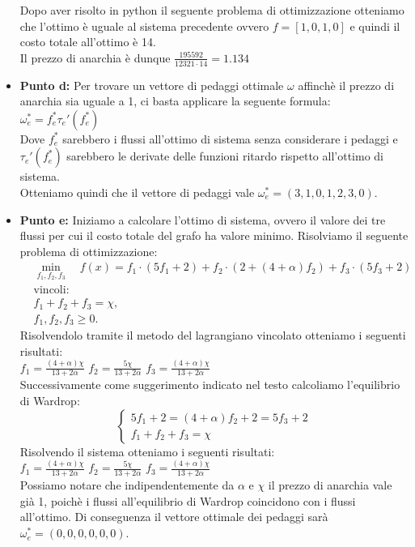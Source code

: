 \documentclass[a4paper,12pt]{article}
\begin{document}
\begin{itemize}
			Dopo aver risolto in python il seguente problema di ottimizzazione otteniamo che l'ottimo è uguale al sistema precedente ovvero $f=[1,0,1,0]$ e quindi il costo totale all'ottimo è 14.\\
			Il prezzo di anarchia è dunque $\frac{195592}{12321 \cdot14}=1.134$
			\item \textbf{Punto d: }Per trovare un vettore di pedaggi ottimale $\omega$ affinchè il prezzo di anarchia sia uguale a 1, ci basta applicare la seguente formula:\\
			$\omega_e^{*}=f_e^*\tau_e'(f_e^*)$\\
			Dove $f_e^*$ sarebbero i flussi all'ottimo di sistema senza considerare i pedaggi e $\tau_e'(f_e^*)$ sarebbero le derivate delle funzioni ritardo rispetto all'ottimo di sistema.\\
			Otteniamo quindi che il vettore di pedaggi vale $\omega_e^{*}=(3,1,0,1,2,3,0)$.
			\item \textbf{Punto e: }Iniziamo a calcolare l'ottimo di sistema, ovvero il valore dei tre flussi per cui il costo totale del grafo ha valore minimo. Risolviamo il seguente problema di ottimizzazione:\\
			\[
			\begin{aligned}
				&\min_{f_1, f_2, f_3} \quad f(x) = f_1 \cdot (5f_1+2) + f_2 \cdot (2+(4+\alpha)f_2) + f_3 \cdot(5f_3+2) \\
				&\text{vincoli:} \\
				&f_1 + f_2 + f_3= \chi, \\
				&f_1,f_2,f_3 \geq 0.
			\end{aligned}
			\]
			Risolvendolo tramite il metodo del lagrangiano vincolato otteniamo i seguenti risultati:\\
			$f_1=\frac{(4+\alpha)\chi}{13+2\alpha}$ $f_2=\frac{5\chi}{13+2\alpha}$ $f_3=\frac{(4+\alpha)\chi}{13+2\alpha}$\\
			Successivamente come suggerimento indicato nel testo calcoliamo l'equilibrio di Wardrop:\\
			\begin{equation}
				\begin{cases}
					5f_1+2=(4+\alpha)f_2+2=5f_3+2 \\
					f_1+f_2+f_3=\chi
				\end{cases}
			\end{equation}
			Risolvendo il sistema otteniamo i seguenti risultati:\\
			$f_1=\frac{(4+\alpha)\chi}{13+2\alpha}$ $f_2=\frac{5\chi}{13+2\alpha}$ $f_3=\frac{(4+\alpha)\chi}{13+2\alpha}$\\
			Possiamo notare che indipendentemente da $\alpha$ e $\chi$ il prezzo di anarchia vale già 1, poichè i flussi all'equilibrio di Wardrop coincidono con i flussi all'ottimo. Di conseguenza il vettore ottimale dei pedaggi sarà $\omega_e^{*}=(0,0,0,0,0,0)$.
			\end{itemize}
\end{document}

